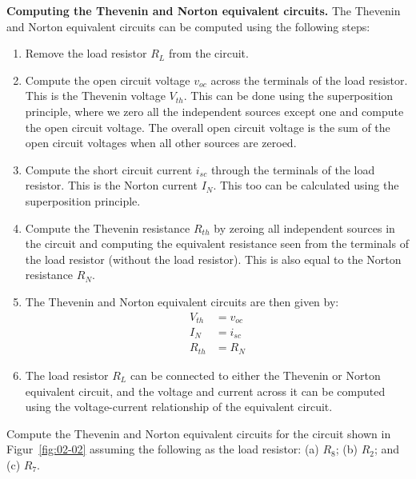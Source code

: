 \noindent\textbf{Computing the Thevenin and Norton equivalent circuits.} The Thevenin and Norton equivalent circuits can be computed using the following steps:
\begin{enumerate}
    \item Remove the load resistor $R_L$ from the circuit.
    \item Compute the open circuit voltage $v_{oc}$ across the terminals of the load resistor. This is the Thevenin voltage $V_{th}$. This can be done using the superposition principle, where we zero all the independent sources except one and compute the open circuit voltage. The overall open circuit voltage is the sum of the open circuit voltages when all other sources are zeroed.
    \item Compute the short circuit current $i_{sc}$ through the terminals of the load resistor. This is the Norton current $I_{N}$. This too can be calculated using the superposition principle.
    \item Compute the Thevenin resistance $R_{th}$ by zeroing all independent sources in the circuit and computing the equivalent resistance seen from the terminals of the load resistor (without the load resistor). This is also equal to the Norton resistance $R_{N}$.
    \item The Thevenin and Norton equivalent circuits are then given by:
    \begin{equation}
        \begin{split}
            V_{th} &= v_{oc}\\
            I_{N} &= i_{sc}\\
            R_{th} &= R_{N}
        \end{split}
        \label{eq:02-23}
    \end{equation}
    \item The load resistor $R_L$ can be connected to either the Thevenin or Norton equivalent circuit, and the voltage and current across it can be computed using the voltage-current relationship of the equivalent circuit.
\end{enumerate}

\begin{boxedstuff}
    \begin{problem}
        Compute the Thevenin and Norton equivalent circuits for the circuit shown in Figur~\ref{fig:02-02} assuming the following as the load resistor: (a) $R_8$; (b) $R_2$; and (c) $R_7$.
    \end{problem}
\end{boxedstuff}


